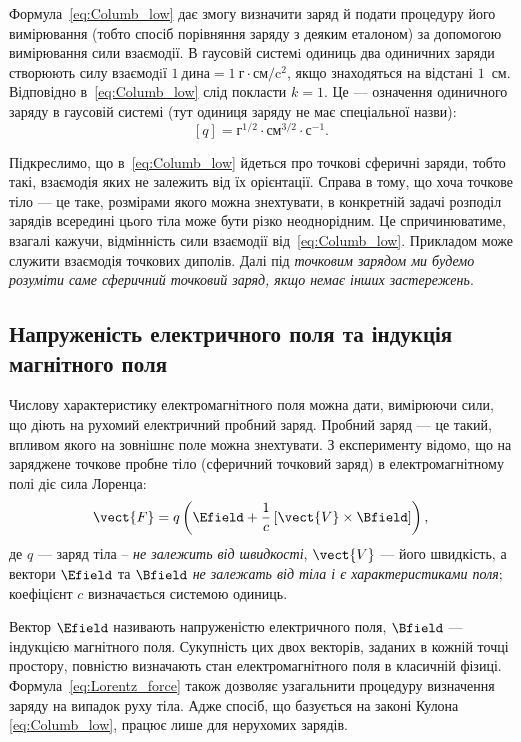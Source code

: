 Формула~\eqref{eq:Columb_low} дає змогу визначити заряд й подати процедуру його
вимірювання (тобто спосіб порівняння заряду з деяким еталоном) за
допомогою вимірювання сили взаємодії. В гаусовiй системi одиниць два
одиничних заряди створюють силу взаємодiї $1\ \text{дина} = 1\ \text{г}\cdot\text{см} / \text{c}^2$,
якщо знаходяться на відстані $1$~см. Відповідно в~\eqref{eq:Columb_low} слід покласти $k=1$. Це --- означення
одиничного заряду в гаусовій системі (тут одиниця заряду не має спеціальної назви):
\begin{equation*}
	\left[q\right] = \text{г}^{1/2}\cdot\text{см}^{3/2}\cdot\text{с}^{-1}.
\end{equation*}

Підкреслимо, що в~\eqref{eq:Columb_low} йдеться про точкові сферичні заряди, тобто
такі, взаємодія яких не залежить від їх орієнтації. Справа в тому, що хоча
точкове тіло --- це таке, розмірами якого можна знехтувати, в конкретній задачі
розподіл зарядів всередині цього тіла може бути різко неоднорідним. Це
спричинюватиме, взагалі кажучи, відмінність сили взаємодії від~\eqref{eq:Columb_low}.
Прикладом може служити взаємодія точкових диполів. Далі під \emph{точковим
	зарядом ми будемо розуміти саме сферичний точковий заряд, якщо немає
	інших застережень}.

\subsection*{Напруженість електричного поля та індукція магнітного поля}

Числову характеристику електромагнітного поля можна дати,
вимірюючи сили, що діють на рухомий електричний пробний заряд. Пробний
заряд --- це такий, впливом якого на зовнішнє поле можна знехтувати.
З експерименту відомо, що на заряджене точкове пробне тіло (сферичний
точковий заряд) в електромагнітному полі діє сила Лоренца:
\begin{equation}\label{eq:Lorentz_force}
	\vect{F} = q\left( \Efield + \frac1c \left[ \vect{V}\times\Bfield\right] \right),
\end{equation}
де $q$ --- заряд тіла -- \emph{не залежить від швидкості}, $\vect{V}$ --- його швидкість, а вектори $\Efield$
та $\Bfield$ \emph{не залежать від тіла і є характеристиками поля}; коефіцієнт $c$ визначається системою одиниць.

Вектор $\Efield$ називають напруженістю електричного поля, $\Bfield$ --- індукцією
магнітного поля. Сукупність цих двох векторів, заданих в кожній точці
простору, повністю визначають стан електромагнітного поля в класичній
фізиці. Формула~\eqref{eq:Lorentz_force} також дозволяє узагальнити процедуру визначення
заряду на випадок руху тіла. Адже спосіб, що базується на законі Кулона
\eqref{eq:Columb_low}, працює лише для нерухомих зарядів.


